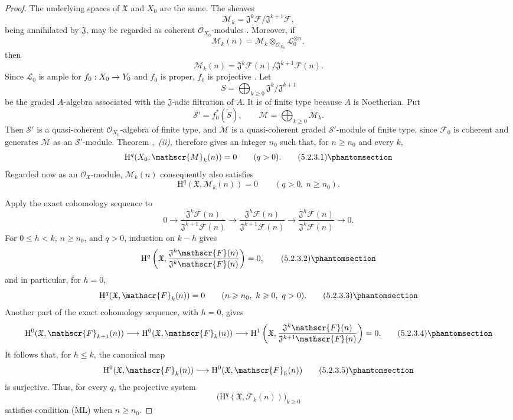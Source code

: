 \documentclass[oneside]{amsart}
\theoremstyle{ega-env-style}
\theoremstyle{ega-thm-env-style}
\theoremstyle{ega-defn-env-style}
\def\mathcal{\mathscr}
\def\sh{\mathcal}                   %
\def\leq{\leqslant}                 %
\def\geq{\geqslant}                 %
\def\HH{\mathrm{H}}                 %
\renewcommand{\to}{\mathchoice{\longrightarrow}{\rightarrow}{\rightarrow}{\rightarrow}}
\newcommand{\oldpage}[2][]{{\marginnote{\normalfont{\textbf{#1}~|~#2}}}\ignorespaces}
\let\EGAOriginalLabel\label
\renewcommand{\label}[1]{\phantomsection\EGAOriginalLabel{#1}}
\begin{document}
\begin{proof}
The underlying spaces of $\mathfrak{X}$ and $X_0$ are the same.
The sheaves
\[
  \sh{M}_k
  =
  \mathfrak{J}^k\sh{F}/\mathfrak{J}^{k+1}\sh{F},
\]
being annihilated by $\mathfrak{J}$, may be regarded as coherent
$\sh{O}_{X_0}$-modules .  Moreover, if
\[
  \sh{M}_k(n)
  =
  \sh{M}_k\otimes_{\sh{O}_{X_0}}\sh{L}_0^{\otimes n},
\]
then
\[
  \sh{M}_k(n)
  =
  \mathfrak{J}^k\sh{F}(n)/
  \mathfrak{J}^{k+1}\sh{F}(n).
\]
Since $\sh{L}_0$ is ample for $f_0:X_0\to Y_0$ and $f_0$ is
proper,
\oldpage[III]{152}
$f_0$ is projective .  Let
\[
  S=\bigoplus_{k\geq0}
  \mathfrak{J}^k/\mathfrak{J}^{k+1}
\]
be the graded $A$-algebra associated with the
$\mathfrak{J}$-adic filtration of $A$.  It is of finite type
because $A$ is Noetherian.  Put
\[
  \sh{S}'=f_0^*(\widetilde{S}),\qquad
  \sh{M}=\bigoplus_{k\geq0}\sh{M}_k.
\]
Then $\sh{S}'$ is a quasi-coherent $\sh{O}_{X_0}$-algebra of
finite type, and $\sh{M}$ is a quasi-coherent graded
$\sh{S}'$-module of finite type, since $\sh{F}_0$ is coherent and
generates $\sh{M}$ as an $\sh{S}'$-module.  Theorem
,~\emph{(ii)}, therefore gives an integer $n_0$
such that, for $n\geq n_0$ and every $k$,
\[
  \HH^q(X_0,\sh{M}_k(n))=0
  \qquad(q>0).
  \tag{5.2.3.1}
  \label{III.5.2.3.1}
\]
Regarded now as an $\sh{O}_{\mathfrak{X}}$-module,
$\sh{M}_k(n)$ consequently also satisfies
\[
  \HH^q(\mathfrak{X},\sh{M}_k(n))=0
  \qquad(q>0,\ n\geq n_0).
\]

Apply the exact cohomology sequence to
\[
  0\longrightarrow
  \frac{\mathfrak{J}^k\sh{F}(n)}
       {\mathfrak{J}^{k+1}\sh{F}(n)}
  \longrightarrow
  \frac{\mathfrak{J}^h\sh{F}(n)}
       {\mathfrak{J}^{k+1}\sh{F}(n)}
  \longrightarrow
  \frac{\mathfrak{J}^h\sh{F}(n)}
       {\mathfrak{J}^{k}\sh{F}(n)}
  \longrightarrow0.
\]
For $0\leq h<k$, $n\geq n_0$, and $q>0$, induction on $k-h$
gives
\[
  \HH^q\left(
    \mathfrak{X},
    \frac{\mathfrak{J}^h\sh{F}(n)}
         {\mathfrak{J}^{k}\sh{F}(n)}
  \right)=0,
  \tag{5.2.3.2}
  \label{III.5.2.3.2}
\]
and in particular, for $h=0$,
\[
  \HH^q(\mathfrak{X},\sh{F}_k(n))=0
  \qquad(n\geq n_0,\ k\geq0,\ q>0).
  \tag{5.2.3.3}
  \label{III.5.2.3.3}
\]
Another part of the exact cohomology sequence, with $h=0$, gives
\[
  \HH^0(\mathfrak{X},\sh{F}_{k+1}(n))
  \longrightarrow
  \HH^0(\mathfrak{X},\sh{F}_k(n))
  \longrightarrow
  \HH^1\left(
    \mathfrak{X},
    \frac{\mathfrak{J}^k\sh{F}(n)}
         {\mathfrak{J}^{k+1}\sh{F}(n)}
  \right)
  =0.
  \tag{5.2.3.4}
  \label{III.5.2.3.4}
\]
It follows that, for $h\leq k$, the canonical map
\[
  \HH^0(\mathfrak{X},\sh{F}_k(n))
  \longrightarrow
  \HH^0(\mathfrak{X},\sh{F}_h(n))
  \tag{5.2.3.5}
  \label{III.5.2.3.5}
\]
is surjective.  Thus, for every $q$, the projective system
\[
  \bigl(\HH^q(\mathfrak{X},\sh{F}_k(n))\bigr)_{k\geq0}
\]
satisfies condition (ML) when $n\geq n_0$.


\end{proof}
\end{document}
